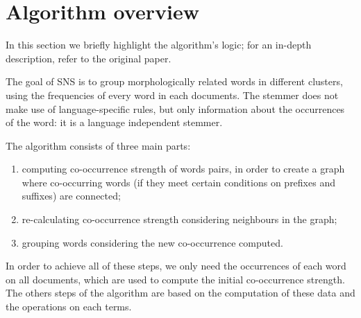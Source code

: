 \section{Algorithm overview}
    In this section we briefly highlight the algorithm's logic; for an in-depth description, refer to the original paper\cite{sns}.
 
    The goal of SNS is to group morphologically related words in different clusters, using the frequencies of every word in each documents. The stemmer does not make use of language-specific rules, but only information about the occurrences of the word: it is a language independent stemmer.
    
The algorithm consists of three main parts:

    \begin{enumerate}
        \item computing co-occurrence strength of words pairs, in order to create a graph where co-occurring words (if they meet certain conditions on prefixes and suffixes) are connected;
        \item re-calculating co-occurrence strength considering neighbours in the graph;
        \item grouping words considering the new co-occurrence computed.
    \end{enumerate}

    In order to achieve all of these steps, we only need the occurrences of each word on all documents, which are used to compute the initial co-occurrence strength. The others steps of the algorithm are based on the computation of these data and the operations on each terms.